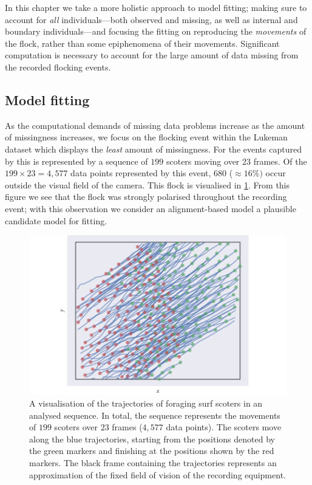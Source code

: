 In this chapter we take a more holistic approach to model fitting; making sure
to account for \emph{all} individuals---both observed and missing, as well as
internal and boundary individuals---and focusing the fitting on reproducing
the \emph{movements} of the flock, rather than some epiphenomena of their
movements. Significant computation is necessary to account for the large amount
of data missing from the recorded flocking events.

\subsection{Model fitting}

As the computational demands of missing data problems increase as the amount of
missingness increases, we focus on the flocking event within the Lukeman dataset
which displays the \emph{least} amount of missingness. For the events captured
by \textcite{lukeman10} this is represented by a sequence of $199$ scoters
moving over $23$ frames. Of the $199\times23=4,577$ data points represented by
this event, $680$ ($\approx16\%)$ occur outside the visual field of the camera.
This flock is visualised in \cref{fig:scoter_traj}. From this figure we see
that the flock was strongly polarised throughout the recording event; with this
observation we consider an alignment-based model a plausible candidate model
for fitting.

\begin{figure}[tb]
  \includegraphics{data_00_traj.pdf}
  \caption{A visualisation of the trajectories of foraging surf scoters in an
    analysed sequence. In total, the sequence represents the movements of
    $199$ scoters over $23$ frames ($4,577$ data points). The scoters move
    along the blue trajectories, starting from the positions denoted by the
    green markers and finishing at the positions shown by the red markers. The
    black frame containing the trajectories represents an approximation of the
    fixed field of vision of the recording equipment.}
  \label{fig:scoter_traj}
\end{figure}


